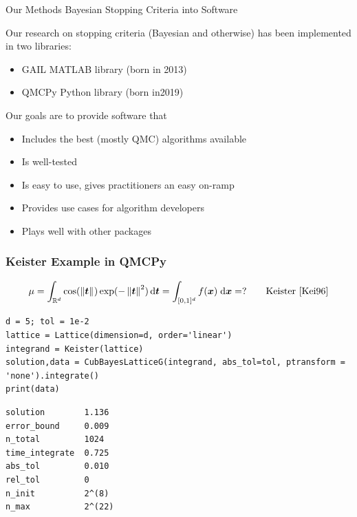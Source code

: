 \documentclass[11pt,compress,xcolor={usenames,dvipsnames},aspectratio=169]{beamer}
\begin{document}
\begin{frame}{Our Methods Bayesian Stopping Criteria into Software}
	
	\vspace{-3ex}
	
	Our research on stopping criteria (Bayesian and otherwise) has been implemented in two libraries:
	\begin{itemize}
		\item GAIL \cite{ChoEtal21a} MATLAB library (born in 2013)
		\item QMCPy \cite{QMCPy2020a} Python library (born in2019)
	\end{itemize}
Our goals are to provide software that 
\begin{itemize}
	\item Includes the best (mostly QMC) algorithms available
	\item Is well-tested
	\item Is easy to use, gives practitioners an easy on-ramp
	\item Provides use cases for algorithm developers 
	\item Plays well with other packages
\end{itemize}
	
	
\end{frame}
	

\begin{frame}[fragile]\frametitle{Keister Example in QMCPy}
	\vspace{-5ex}
	\[
	\mu = \int_{\mathbb{R}^d} \cos(\left \lVert \boldsymbol{t} \right \rVert_{{}}) \exp(-\left \lVert \boldsymbol{t} \right \rVert_{{}}^2) \, {\rm d} \boldsymbol{t} = \int_{[0,1]^d} f(\boldsymbol{x}) \; {\rm d} \boldsymbol{x} =  ? \qquad \text{Keister \cite{Kei96}}
	\]
\noindent\begin{minipage}{0.47\textwidth}
\begin{lstlisting}[style=Python]
d = 5; tol = 1e-2
lattice = Lattice(dimension=d, order='linear')
integrand = Keister(lattice)
solution,data = CubBayesLatticeG(integrand, abs_tol=tol, ptransform = 'none').integrate()
print(data)
\end{lstlisting}
\end{minipage} 
\qquad
\begin{minipage}{0.47\textwidth}
\begin{lstlisting}[style=Python]
solution        1.136
error_bound     0.009
n_total         1024
time_integrate  0.725
abs_tol         0.010
rel_tol         0
n_init          2^(8)
n_max           2^(22)
\end{lstlisting}
\end{minipage} 

\end{frame}
\end{document}
